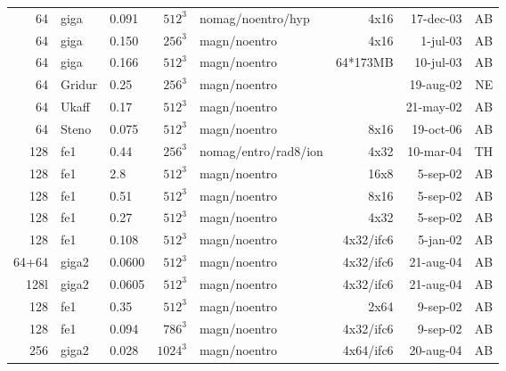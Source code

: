 \documentclass[\mydriver,12pt,twoside,notitlepage,a4paper]{article}
\begin{document}
\begin{center}
\begin{small}
\begin{longtable}{rllrlrrr}
  64 & giga  & 0.091& $512^3$ &nomag/noentro/hyp&4x16&17-dec-03& AB \\
  64 & giga  & 0.150& $256^3$ & magn/noentro &  4x16  &  1-jul-03 & AB \\
  64 & giga  & 0.166& $512^3$ & magn/noentro &64*173MB& 10-jul-03 & AB \\
  64 & Gridur& 0.25 & $256^3$ & magn/noentro &        & 19-aug-02 & NE \\
  64 & Ukaff & 0.17 & $512^3$ & magn/noentro &        & 21-may-02 & AB \\
  64 & Steno & 0.075& $512^3$ & magn/noentro &  8x16  & 19-oct-06 & AB \\
 128 & fe1   & 0.44 & $256^3$ & nomag/entro/rad8/ion &  4x32  & 10-mar-04 & TH \\
 128 & fe1   & 2.8  & $512^3$ & magn/noentro & 16x8   &  5-sep-02 & AB \\
 128 & fe1   & 0.51 & $512^3$ & magn/noentro & 8x16   &  5-sep-02 & AB \\
 128 & fe1   & 0.27 & $512^3$ & magn/noentro & 4x32   &  5-sep-02 & AB \\
 128 & fe1   & 0.108& $512^3$ & magn/noentro &4x32/ifc6& 5-jan-02 & AB \\
64+64& giga2 & 0.0600&$512^3$ & magn/noentro &4x32/ifc6&21-aug-04 & AB \\
 128l& giga2 & 0.0605&$512^3$ & magn/noentro &4x32/ifc6&21-aug-04 & AB \\
 128 & fe1   & 0.35 & $512^3$ & magn/noentro & 2x64   &  9-sep-02 & AB \\
 128 & fe1   & 0.094& $786^3$ & magn/noentro &4x32/ifc6& 9-sep-02 & AB \\
 256 & giga2 & 0.028& $1024^3$& magn/noentro &4x64/ifc6&20-aug-04 & AB \\
    \bottomrule
  \end{longtable}
    \end{small}
  \end{center}
\normalsize
\end{document}
